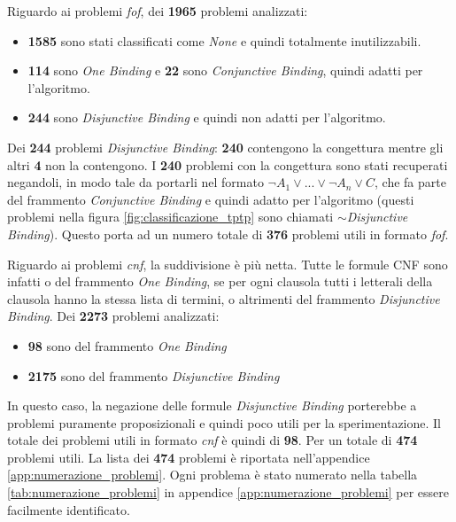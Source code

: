 \documentclass[./main.tex]{subfiles}
\begin{document}
Riguardo ai problemi \textit{fof}, dei \textbf{1965} problemi analizzati:
\begin{itemize}
    \item \textbf{1585} sono stati classificati come \textit{None} e quindi totalmente inutilizzabili.
    \item \textbf{114} sono \textit{One Binding} e \textbf{22} sono \textit{Conjunctive Binding}, quindi adatti per l'algoritmo.
    \item \textbf{244} sono \textit{Disjunctive Binding} e quindi non adatti per l'algoritmo.
\end{itemize}
Dei \textbf{244} problemi \textit{Disjunctive Binding}: \textbf{240} contengono la congettura mentre gli altri \textbf{4} non la contengono.
I \textbf{240} problemi con la congettura sono stati recuperati negandoli, in modo tale da portarli nel formato $\lnot A_1 \lor ... \lor \lnot A_n \lor C$, 
che fa parte del frammento \textit{Conjunctive Binding} e quindi adatto per l'algoritmo 
(questi problemi nella figura \ref{fig:classificazione_tptp} sono chiamati \textit{$\sim$Disjunctive Binding}).
Questo porta ad un numero totale di \textbf{376} problemi utili in formato \textit{fof}.

Riguardo ai problemi \textit{cnf}, la suddivisione è più netta.
Tutte le formule CNF sono infatti o del frammento \textit{One Binding}, se per ogni clausola
tutti i letterali della clausola hanno la stessa lista di termini, o altrimenti del frammento \textit{Disjunctive Binding}.
Dei \textbf{2273} problemi analizzati:
\begin{itemize}
    \item \textbf{98} sono del frammento \textit{One Binding}
    \item \textbf{2175} sono del frammento \textit{Disjunctive Binding}
\end{itemize}
In questo caso, la negazione delle formule \textit{Disjunctive Binding} porterebbe a problemi puramente proposizionali e quindi poco utili per la sperimentazione.
Il totale dei problemi utili in formato \textit{cnf} è quindi di \textbf{98}. Per un totale di \textbf{474} problemi utili.
La lista dei \textbf{474} problemi è riportata nell'appendice \ref{app:numerazione_problemi}.
Ogni problema è stato numerato nella tabella \ref{tab:numerazione_problemi} in appendice \ref{app:numerazione_problemi} per essere facilmente identificato.


\end{document}
